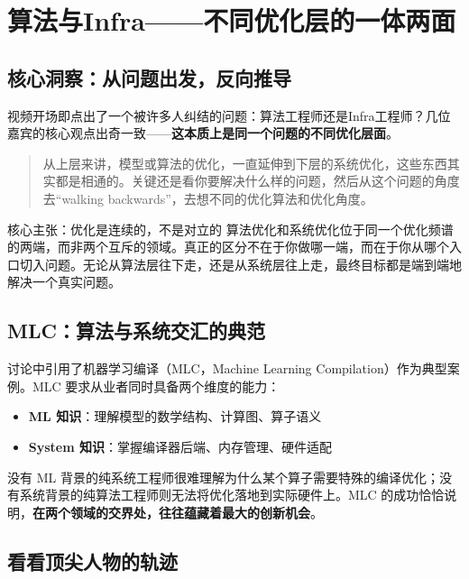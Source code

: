 
\section{算法与Infra——不同优化层的一体两面}

\subsection{核心洞察：从问题出发，反向推导}

视频开场即点出了一个被许多人纠结的问题：算法工程师还是Infra工程师？几位嘉宾的核心观点出奇一致——\textbf{这本质上是同一个问题的不同优化层面}。

\begin{quote}
从上层来讲，模型或算法的优化，一直延伸到下层的系统优化，这些东西其实都是相通的。关键还是看你要解决什么样的问题，然后从这个问题的角度去``walking backwards''，去想不同的优化算法和优化角度。
\end{quote}

\begin{importantbox}{核心主张：优化是连续的，不是对立的}
算法优化和系统优化位于同一个优化频谱的两端，而非两个互斥的领域。真正的区分不在于你做哪一端，而在于你从哪个入口切入问题。无论从算法层往下走，还是从系统层往上走，最终目标都是端到端地解决一个真实问题。
\end{importantbox}

\subsection{MLC：算法与系统交汇的典范}

讨论中引用了机器学习编译（MLC，Machine Learning Compilation）作为典型案例。MLC 要求从业者同时具备两个维度的能力：

\begin{itemize}
    \item \textbf{ML 知识}：理解模型的数学结构、计算图、算子语义
    \item \textbf{System 知识}：掌握编译器后端、内存管理、硬件适配
\end{itemize}

没有 ML 背景的纯系统工程师很难理解为什么某个算子需要特殊的编译优化；没有系统背景的纯算法工程师则无法将优化落地到实际硬件上。MLC 的成功恰恰说明，\textbf{在两个领域的交界处，往往蕴藏着最大的创新机会}。

\subsection{看看顶尖人物的轨迹}

